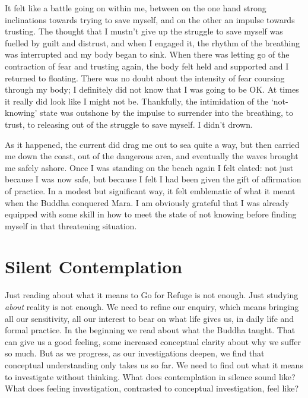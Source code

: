 It felt like a battle going on within me, between on the one hand strong
inclinations towards trying to save myself, and on the other an impulse
towards trusting. The thought that I mustn’t give up the struggle to
save myself was fuelled by guilt and distrust, and when I engaged it,
the rhythm of the breathing was interrupted and my body began to sink.
When there was letting go of the contraction of fear and trusting again,
the body felt held and supported and I returned to floating. There was
no doubt about the intensity of fear coursing through my body; I
definitely did not know that I was going to be OK. At times it really
did look like I might not be. Thankfully, the intimidation of the
‘not-knowing’ state was outshone by the impulse to surrender into the
breathing, to trust, to releasing out of the struggle to save myself. I
didn’t drown.

As it happened, the current did drag me out to sea quite a way, but then
carried me down the coast, out of the dangerous area, and eventually the
waves brought me safely ashore. Once I was standing on the beach again I
felt elated: not just because I was now safe, but because I felt I had
been given the gift of affirmation of practice. In a modest but
significant way, it felt emblematic of what it meant when the Buddha
conquered Mara. I am obviously grateful that I was already equipped with
some skill in how to meet the state of not knowing before finding myself
in that threatening situation.

\section{Silent Contemplation}

Just reading about what it means to Go for Refuge is not enough. Just
studying \emph{about} reality is not enough. We need to refine our enquiry,
which means bringing all our sensitivity, all our interest to bear on
what life gives us, in daily life and formal practice. In the beginning
we read about what the Buddha taught. That can give us a good feeling,
some increased conceptual clarity about why we suffer so much. But as we
progress, as our investigations deepen, we find that conceptual
understanding only takes us so far. We need to find out what it means to
investigate without thinking. What does contemplation in silence sound
like? What does feeling investigation, contrasted to conceptual
investigation, feel like?

